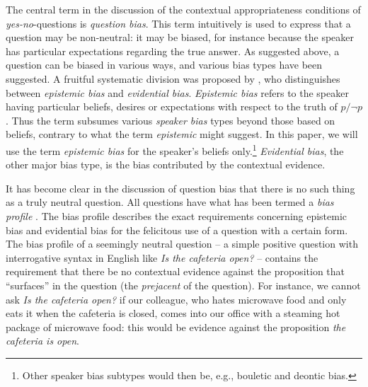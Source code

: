 \documentclass[output=paper,colorlinks,citecolor=brown]{langscibook}
\begin{document}
The central term in the discussion of the contextual appropriateness conditions of \textit{yes-no}-questions is \textit{question bias}. This term intuitively is used to express that a question may be non-neutral: it may be biased, for instance because the speaker has particular expectations regarding the true answer. As suggested above, a question can be biased in various ways, and various bias types have been suggested. A fruitful systematic division was proposed by \citet{sudo13RG}, who distinguishes between \textit{epistemic bias} and \textit{evidential bias}. \textit{Epistemic bias} refers to the speaker having particular beliefs, desires or expectations with respect to the truth of $p / \neg p$. Thus the term subsumes various \textit{speaker bias} types beyond those based on beliefs, contrary to what the term \textit{epistemic} might suggest. In this paper, we will use the term \textit{epistemic bias} for the speaker's beliefs only.\footnote[2]{Other speaker bias subtypes would then be, e.g., bouletic and deontic bias.} \textit{Evidential bias}, the other major bias type, is the bias contributed by the contextual evidence.

It has become clear in the discussion of question bias that there is no such thing as a truly neutral question. All questions have what has been termed a \textit{bias profile} \citep{gaertner+gyuris17}. The bias profile describes the exact requirements concerning epistemic bias and evidential bias for the felicitous use of a question with a certain form. The bias profile of a seemingly neutral question – a simple positive question with interrogative syntax in English like \textit{Is the cafeteria open?} – contains the requirement that there be no contextual evidence against the proposition that ``surfaces'' in the question (the \textit{prejacent} of the question). For instance, we cannot ask \textit{Is the cafeteria open?} if our colleague, who hates microwave food and only eats it when the cafeteria is closed, comes into our office with a steaming hot package of microwave food: this would be evidence against the proposition \textit{the cafeteria is open}.
\end{document}
